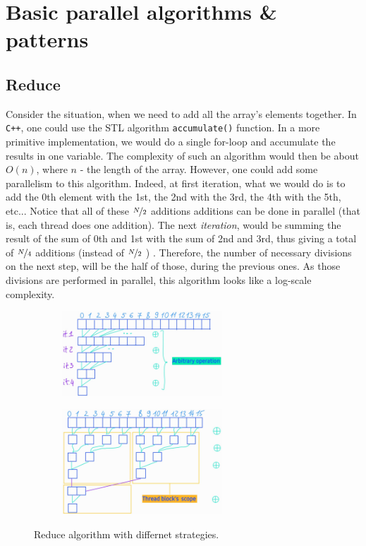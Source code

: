\section{Basic parallel algorithms \& patterns}
\subsection{Reduce}
Consider the situation, when we need to add all the array's elements together. In \verb|C++|, one could use 
the STL algorithm \verb|accumulate()| function. In a more primitive implementation, we would do a single for-loop 
and accumulate the results in one variable. The complexity of such an algorithm would then be about $O(n)$, where 
$n$ - the length of the array. However, one could add some parallelism to this algorithm. 
Indeed, at first iteration, what we would 
do is to add the 0th element with the 1st, the 2nd with the 3rd, the 4th with the 5th, etc... Notice that 
all of these $\nicefrac{N}{2}$ additions additions can be done in parallel (that is, each thread does one addition). The next \textit{iteration}, would be 
summing the result of the sum of 0th and 1st with the sum of 2nd and 3rd, thus giving a total of 
$\nicefrac{N}{4}$ additions (instead of $\nicefrac{N}{2}$ ) . 
Therefore, the number of necessary divisions on the next step, will be the half of those, during the previous ones.
As those divisions are performed in parallel, this algorithm looks like a log-scale complexity. 

\begin{figure}
   \centering
   \begin{subfigure}[t]{0.45\textwidth}
        \centering
        \includegraphics[width=6cm]{pngs/reduce_global.jpg}
        \label{fig:static}
    \end{subfigure}
    \begin{subfigure}[t]{0.45\textwidth}
        \centering
        \includegraphics[width=6cm]{pngs/reduce_shared.jpg}
        \label{fig:dynamic}
    \end{subfigure}
\label{fig:reduce}
    \caption{Reduce algorithm with differnet strategies.}
\end{figure}

